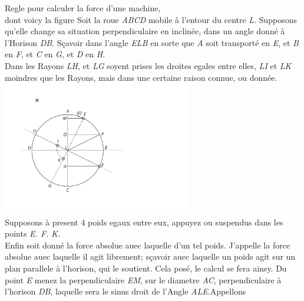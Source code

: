 \pstart 
\normalsize
\noindent
[3~v\textsuperscript{o}]
\pend
\pstart
\centering
\noindent
Regle pour calculer la force d'une machine,\protect{}\protect{}\\%
dont voicy la figure
\pend
\vspace{1.0em}
\pstart
\noindent Soit la roue\protect{} \textit{ABCD} mobile \`{a} l'entour du centre \textit{L}. Supposons qu'elle change sa situation perpendiculaire en inclin\'{e}e, dans un angle donn\'{e} \`{a} l'Horison \textit{DB}. S\c{c}avoir dans l'angle \textit{ELB} en sorte que \textit{A} soit trans\-port\'{e} en \textit{E}, et \textit{B} en \textit{F}, et \textit{C} en \textit{G}, et \textit{D} en \textit{H}.\\ \indent Dans les Rayons \textit{LH}, et \textit{LG} soyent prises les droites egales entre elles, \textit{LI} et \textit{LK} moindres que les Rayons, mais dans une certaine raison connue, ou donn\'{e}e.
\pend
\vspace{1.5em}
\pstart
\noindent
\centering
\includegraphics[trim = 0mm -3mm -2mm 0mm, clip, width=0.62\textwidth]{images/lh0351009_003v-d1.pdf}\\
\noindent {}
\pend
\newpage
\pstart Supposons \`{a} present 4 poids egaux entre eux, appuyez ou suspendus dans les points \textit{E. F. K.} \\ \indent Enfin soit donn\'{e} la force absolue auec laquelle d'un tel poids\protect{}.
\pend 
\pstart J'appelle la force absolue auec laquelle il agit librement; s\c{c}avoir auec laquelle un poids agit sur un plan parallele \`{a} l'horison, qui le soutient.
\pend 
\pstart Cela pos\'{e}, le calcul se fera ainsy.
\pend 
\pstart Du point \textit{E} menez la perpendiculaire \textit{EM}, sur le diametre \textit{AC}, perpendiculaire \`{a} l'horison \textit{DB}, laquelle sera le sinus droit de l'Angle \textit{ALE}.\pend \pstart Appellons 
